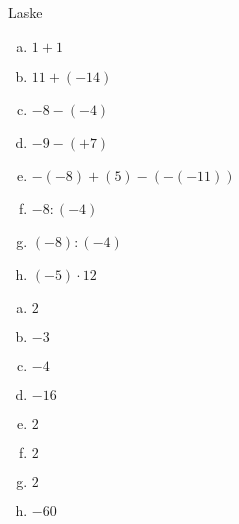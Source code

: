 \begin{tehtava}
Laske
\begin{enumerate}[a)]
    \item $1+1$
    \item $11+(-14)$
    \item $-8-(-4)$
    \item $-9-(+7)$
    \item $-(-8)+(5)-(-(-11))$
    \item $-8:(-4)$
    \item $(-8):(-4)$
    \item $(-5)\cdot 12$
\end{enumerate}
    \begin{vastaus}
    \begin{enumerate}[a)]
        \item $2$
        \item $-3$
        \item $-4$
        \item $-16$
        \item $2$
        \item $2$
        \item $2$
        \item $-60$
    \end{enumerate}
    \end{vastaus}
\end{tehtava}

